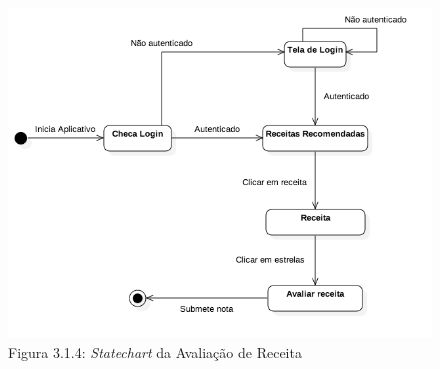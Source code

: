 \documentclass{article}
\begin{document}
\begin{figure}[h!]
	\centering
	\includegraphics[scale=0.5]{state_charts/avaliareceita.png}
  \captionsetup{labelformat=empty}
  \caption{Figura 3.1.4: \emph{Statechart} da Avaliação de Receita}
\end{figure}
\end{document}
